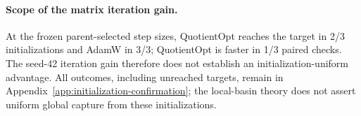 \paragraph{Scope of the matrix iteration gain.}
At the frozen parent-selected step sizes, QuotientOpt reaches the target in 2/3 initializations and AdamW in 3/3; QuotientOpt is faster in 1/3 paired checks. The seed-42 iteration gain therefore does not establish an initialization-uniform advantage. All outcomes, including unreached targets, remain in Appendix~\ref{app:initialization-confirmation}; the local-basin theory does not assert uniform global capture from these initializations.
